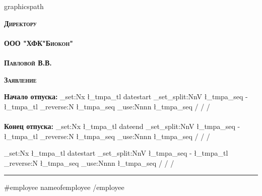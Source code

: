 

{{graphicspath}}

\ExplSyntaxOn
\newcommand{\changedate}[2][/]{%
  \tl_set:Nx \l_tmpa_tl {#2}
  \seq_set_split:NnV \l_tmpa_seq {-} {\l_tmpa_tl}
  \seq_reverse:N \l_tmpa_seq
  \seq_use:Nnnn \l_tmpa_seq {#1} {#1} {#1}
}
\ExplSyntaxOff

\newcommand{\webdate}{ {{datestart}} }
\newcommand{\webdatep}{ {{dateend}} }



\thispagestyle{empty}

\pagestyle{maintext}

\begin{flushright}
\textbf{\textsc{Директору}} \\
\vspace{6mm} \\
\textbf{\textsc{ООО "ХФК"Биокон"}} \\
\vspace{6mm} \\
\textbf{\textsc{Павловой В.В.}} \\
\end{flushright}

\vspace{1cm}

\begin{center}
{\large \textbf{\textsc{Заявление}}}
\end{center}
\vspace{3mm}


\vspace{1cm}
\textbf{Начало отпуска:} \changedate{\webdate}  \\
\vspace{1mm} \\
\textbf{Конец отпуска:}  \changedate{\webdatep} \\
\vspace{5cm}

\noindent \changedate{\webdate} \hspace{5.5cm} \rule{4cm}{0.5pt} \hfill {{#employee}} {{nameofemployee}} {{/employee}}



